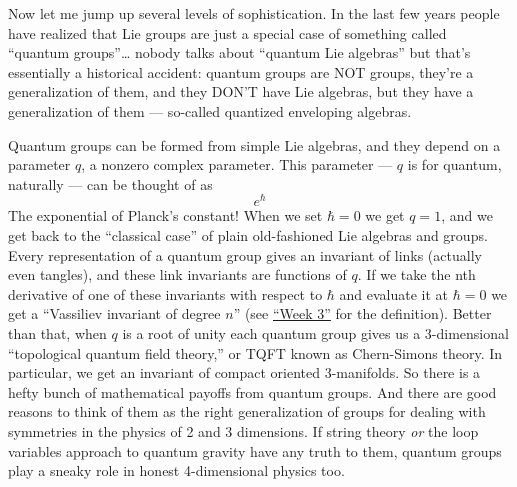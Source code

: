 \documentclass{article}
\begin{document}
Now let me jump up several levels of sophistication. In the last few
years people have realized that Lie groups are just a special case of
something called ``quantum groups''\ldots{} nobody talks about ``quantum
Lie algebras'' but that's essentially a historical accident: quantum
groups are NOT groups, they're a generalization of them, and they DON'T
have Lie algebras, but they have a generalization of them --- so-called
quantized enveloping algebras.

Quantum groups can be formed from simple Lie algebras, and they depend
on a parameter \(q\), a nonzero complex parameter. This parameter ---
\(q\) is for quantum, naturally --- can be thought of as \[e^\hbar\] The
exponential of Planck's constant! When we set \(\hbar = 0\) we get
\(q = 1\), and we get back to the ``classical case'' of plain
old-fashioned Lie algebras and groups. Every representation of a quantum
group gives an invariant of links (actually even tangles), and these
link invariants are functions of \(q\). If we take the nth derivative of
one of these invariants with respect to \(\hbar\) and evaluate it at
\(\hbar = 0\) we get a ``Vassiliev invariant of degree \(n\)'' (see
\protect\hyperlink{week3}{``Week 3''} for the definition). Better than
that, when \(q\) is a root of unity each quantum group gives us a
3-dimensional ``topological quantum field theory,'' or TQFT known as
Chern-Simons theory. In particular, we get an invariant of compact
oriented 3-manifolds. So there is a hefty bunch of mathematical payoffs
from quantum groups. And there are good reasons to think of them as the
right generalization of groups for dealing with symmetries in the
physics of 2 and 3 dimensions. If string theory \emph{or} the loop
variables approach to quantum gravity have any truth to them, quantum
groups play a sneaky role in honest 4-dimensional physics too.
\end{document}
